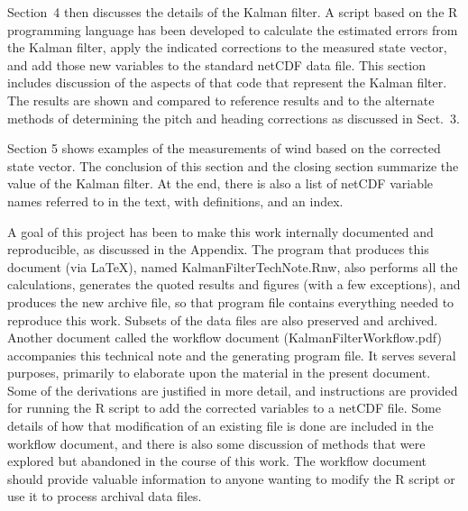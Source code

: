 \documentclass[12pt,twoside,english,12pt,twoside,english]{article}\usepackage[]{graphicx}\usepackage[]{color}
\let\OrgIndex\index
\renewcommand*{\index}[1]{\OrgIndex{#1}}
\begin{document}
Section~4 then discusses the details of the Kalman
filter. A script based on the R programming language
has been developed to calculate the estimated errors
from the Kalman filter, apply the indicated corrections to the measured
state vector, and add those new variables to
the standard netCDF data file.
This section includes discussion of the aspects of that code that
represent the Kalman filter. The results
are shown and compared to reference results and to the alternate methods
of determining the pitch and heading corrections as discussed in Sect.~3. 

Section 5 shows examples of the measurements of wind
based on the corrected state vector. The conclusion of this section
and the closing section summarize the value of the Kalman filter.
At the end, there is also a list of netCDF variable names referred
to in the text, with definitions, and an index.

A goal of this project has been to make this work internally documented
and reproducible, as discussed in the Appendix.
The program that
produces this document (via \LaTeX), named KalmanFilterTechNote.Rnw,
also performs all the calculations,
generates the quoted results and figures (with a few exceptions),
and produces the new archive file,
so that program file contains everything needed to reproduce this
work. Subsets of the data files are also preserved
and archived. Another document called the workflow
document (KalmanFilterWorkflow.pdf) accompanies this technical note
and the generating program file. It serves several purposes, primarily
to elaborate upon the material in the present document. Some of the
derivations are justified in more
detail, and instructions
are provided for running the R script to add the corrected variables
to a netCDF
file. Some details of how that modification of an existing file is
done are included in the workflow document, and there is also some
discussion of methods that were explored but abandoned in the course
of this work. The workflow document should
provide valuable information to anyone wanting to modify the R script
or use it to process archival data files. 
\end{document}
